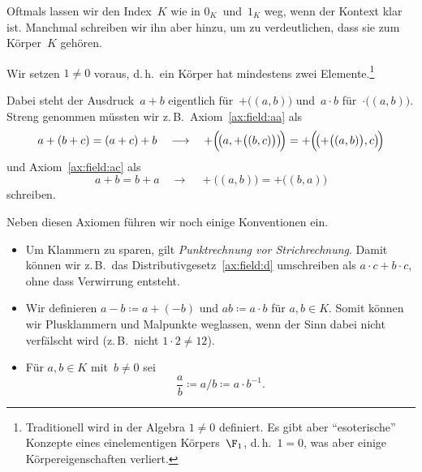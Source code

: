 \documentclass[a4paper]{article}
\begin{document}
Oftmals lassen wir den Index~$K$ wie in $0_K$~und~$1_K$ weg, wenn der Kontext klar ist. Manchmal schreiben wir ihn aber hinzu, um zu verdeutlichen, dass sie zum Körper~$K$ gehören.

\begin{remark}
    Wir setzen $1 \neq 0$ voraus, d.\,h.\ ein Körper hat mindestens zwei Elemente.\footnote{Traditionell wird in der Algebra $1 \neq 0$ definiert. Es gibt aber "`esoterische"' Konzepte eines einelementigen Körpers~$\F_1$, d.\,h.\ $1 = 0$, was aber einige Körpereigenschaften verliert.}
\end{remark}

\begin{remark}
    Dabei steht der Ausdruck~$a+b$ eigentlich für~$+\bigl((a, b)\bigr)$ und~$a\cdot b$ für~$\cdot\bigl((a, b)\bigr)$. Streng genommen müssten wir z.\,B.\ Axiom~\ref{ax:field:aa} als
    \begin{equation*}
        a+(b+c) = (a+c)+b \quad\longrightarrow\quad  +\Bigl(\!\bigl(a, +\bigl((b, c)\bigr)\bigr)\!\Bigr) = +\Bigl(\!\bigl(+\bigl((a, b)\bigr), c\bigr)\!\Bigr)
    \end{equation*}
    und Axiom~\ref{ax:field:ac} als
    \begin{equation*}
        a+b = b+a \quad\longrightarrow\quad +\bigl((a, b)\bigr) = +\bigl((b, a)\bigr)
    \end{equation*}
    schreiben.
\end{remark}

\begin{notation}\label{not:field:convention}
    Neben diesen Axiomen führen wir noch einige Konventionen ein.
    \begin{itemize}
        \item Um Klammern zu sparen, gilt \emph{Punktrechnung vor Strichrechnung}. Damit können wir z.\,B.\ das Distributivgesetz~\ref{ax:field:d} umschreiben als $a\cdot c + b\cdot c$, ohne dass Verwirrung entsteht.
        \item Wir definieren $a-b \coloneqq a+(-b)$ und $ab \coloneqq a\cdot b$ für $a, b \in K$. Somit können wir Plusklammern und Malpunkte weglassen, wenn der Sinn dabei nicht verfälscht wird (z.\,B.\ nicht $1 \cdot 2 \neq 12$).
        \item Für $a, b \in K$ mit~$b \neq 0$ sei
        \begin{equation*}
            \frac{a}{b} \coloneqq a/b \coloneqq a \cdot b^{-1}.
        \end{equation*}
    \end{itemize}
\end{notation}
\end{document}
